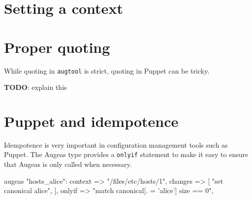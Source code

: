 \section{Setting a context}

\section{Proper quoting}

While quoting in \verb!augtool! is strict, quoting in Puppet can be tricky.

\textbf{TODO}: explain this

\section{Puppet and idempotence}

Idempotence is very important in configuration management tools such as Puppet. The Augeas type provides a \verb!onlyif! statement to make it easy to ensure that Augeas is only called when necessary.

\begin{puppet-augeas}[]
augeas { "hosts_alice":
   context => "/files/etc/hosts/1",
   changes => [
      "set canonical alice",
   ],
   onlyif => "match canonical[. = 'alice'] size == 0",
}
\end{puppet-augeas}

\begin{quote}
\end{quote}

